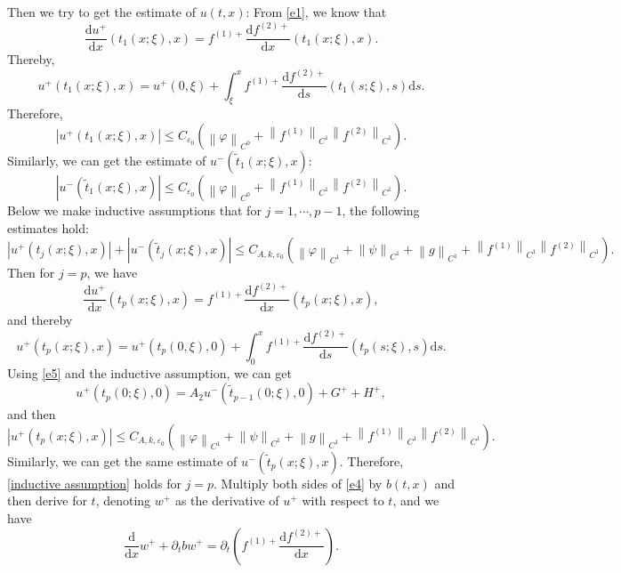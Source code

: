 \documentclass[a4paper,reqno,11pt]{amsart}
\numberwithin{equation}{section} %
\begin{document}
Then we try to get the estimate of $u(t,x)$:
From \eqref{e1}, we know that
$$
\frac{\mathrm{d}u^+}{\mathrm{d}x}\left( t_1(x;\xi ),x \right) =f^{\left( 1 \right) +}\frac{\mathrm{d}f^{\left( 2 \right) +}}{\mathrm{d}x}\left( t_1(x;\xi ),x \right) .
$$
Thereby,
$$
u^+\left( t_1\left( x;\xi \right) ,x \right) =u^+(0,\xi )+\int_{\xi}^x{f^{\left( 1 \right) +}\frac{\mathrm{d}f^{\left( 2 \right) +}}{\mathrm{d}s}\left( t_1\left( s;\xi \right) ,s \right) \mathrm{d}s.}
$$
Therefore,
$$
\left| u^+\left( t_1(x;\xi ),x \right) \right|\leq C_{\varepsilon _0}\left( \left\| \varphi \right\| _{C^0}+\left\| f^{(1)} \right\| _{C^1}\left\| f^{(2)} \right\| _{C^1} \right) .
$$
Similarly, we can get the estimate of $u^-\left( \tilde{t} _1(x;\xi ),x \right) $:
$$
\left| u^-\left( \tilde{t} _1(x;\xi ),x \right) \right|\leq C_{\varepsilon _0}\left( \left\| \varphi \right\| _{C^0}+\left\| f^{(1)} \right\| _{C^1}\left\| f^{(2)} \right\| _{C^1} \right) .
$$
Below we make inductive assumptions that for $j=1,\cdots,p-1$, the following estimates hold:
\begin{equation}\label{inductive assumption}
\left| u^+\left( t_j(x;\xi ),x \right) \right|+\left| u^-\left( \tilde{t}_j(x;\xi ),x \right) \right|\leq C_{A,k,\varepsilon _0}\left( \left\| \varphi \right\| _{C^1}+\left\| \psi \right\| _{C^1}+\left\| g \right\| _{C^1}+\left\| f^{(1)} \right\| _{C^1}\left\| f^{(2)} \right\| _{C^1} \right) .
\end{equation}
Then for $j=p$, we have
$$
\frac{\mathrm{d}u^+}{\mathrm{d}x}\left( t_p(x;\xi ),x \right) =f^{(1)+}\frac{\mathrm{d}f^{(2)+}}{\mathrm{d}x}\left( t_p(x;\xi ),x \right) ,
$$
and thereby
$$
u^+\left( t_p\left( x;\xi \right) ,x \right) =u^+(t_p(0,\xi ),0)+\int_{0}^x{f^{(1)+}\frac{\mathrm{d}f^{(2)+}}{\mathrm{d}s}\left( t_p\left( s;\xi \right) ,s \right) \mathrm{d}s}.
$$
Using \eqref{e5} and the inductive assumption, we can get
$$
u^+\left(t_p(0 ; \xi), 0\right)=A_2 u^-\left(\tilde{t}_{p-1}(0 ; \xi), 0\right)+ G^+ + H^+ ,
$$
and then
$$
\left| u^+\left( t_p(x;\xi ),x \right) \right|\leq C_{A,k,\varepsilon _0}\left( \left\| \varphi \right\| _{C^1}+\left\| \psi \right\| _{C^1}+\left\| g \right\| _{C^1}+\left\| f^{(1)} \right\| _{C^1}\left\| f^{(2)} \right\| _{C^1} \right) .
$$
Similarly, we can get the same estimate of $u^-\left( \tilde{t} _p(x;\xi ),x \right) $.
Therefore, \eqref{inductive assumption} holds for $j=p$.
Multiply both sides of \eqref{e4} by $b(t,x)$ and then derive for $t$, denoting $w^+$ as the derivative of $u^+$ with respect to $t$, and we have
$$
\frac{\mathrm{d}}{\mathrm{d}x}w^++\partial _tbw^+=\partial _t\left( f^{(1)+}\frac{\mathrm{d}f^{(2)+}}{\mathrm{d}x} \right). 
$$
\end{document}
